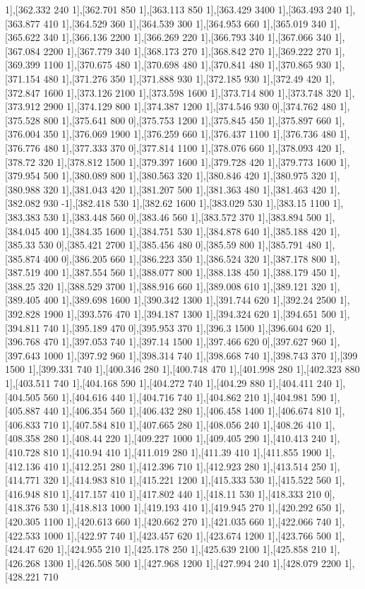 {1],[362.332 240 1],[362.701 850 1],[363.113 850 1],[363.429 3400 1],[363.493 240 1],[363.877 410 1],[364.529 360 1],[364.539 300 1],[364.953 660 1],[365.019 340 1],[365.622 340 1],[366.136 2200 1],[366.269 220 1],[366.793 340 1],[367.066 340 1],[367.084 2200 1],[367.779 340 1],[368.173 270 1],[368.842 270 1],[369.222 270 1],[369.399 1100 1],[370.675 480 1],[370.698 480 1],[370.841 480 1],[370.865 930 1],[371.154 480 1],[371.276 350 1],[371.888 930 1],[372.185 930 1],[372.49 420 1],[372.847 1600 1],[373.126 2100 1],[373.598 1600 1],[373.714 800 1],[373.748 320 1],[373.912 2900 1],[374.129 800 1],[374.387 1200 1],[374.546 930 0],[374.762 480 1],[375.528 800 1],[375.641 800 0],[375.753 1200 1],[375.845 450 1],[375.897 660 1],[376.004 350 1],[376.069 1900 1],[376.259 660 1],[376.437 1100 1],[376.736 480 1],[376.776 480 1],[377.333 370 0],[377.814 1100 1],[378.076 660 1],[378.093 420 1],[378.72 320 1],[378.812 1500 1],[379.397 1600 1],[379.728 420 1],[379.773 1600 1],[379.954 500 1],[380.089 800 1],[380.563 320 1],[380.846 420 1],[380.975 320 1],[380.988 320 1],[381.043 420 1],[381.207 500 1],[381.363 480 1],[381.463 420 1],[382.082 930 -1],[382.418 530 1],[382.62 1600 1],[383.029 530 1],[383.15 1100 1],[383.383 530 1],[383.448 560 0],[383.46 560 1],[383.572 370 1],[383.894 500 1],[384.045 400 1],[384.35 1600 1],[384.751 530 1],[384.878 640 1],[385.188 420 1],[385.33 530 0],[385.421 2700 1],[385.456 480 0],[385.59 800 1],[385.791 480 1],[385.874 400 0],[386.205 660 1],[386.223 350 1],[386.524 320 1],[387.178 800 1],[387.519 400 1],[387.554 560 1],[388.077 800 1],[388.138 450 1],[388.179 450 1],[388.25 320 1],[388.529 3700 1],[388.916 660 1],[389.008 610 1],[389.121 320 1],[389.405 400 1],[389.698 1600 1],[390.342 1300 1],[391.744 620 1],[392.24 2500 1],[392.828 1900 1],[393.576 470 1],[394.187 1300 1],[394.324 620 1],[394.651 500 1],[394.811 740 1],[395.189 470 0],[395.953 370 1],[396.3 1500 1],[396.604 620 1],[396.768 470 1],[397.053 740 1],[397.14 1500 1],[397.466 620 0],[397.627 960 1],[397.643 1000 1],[397.92 960 1],[398.314 740 1],[398.668 740 1],[398.743 370 1],[399 1500 1],[399.331 740 1],[400.346 280 1],[400.748 470 1],[401.998 280 1],[402.323 880 1],[403.511 740 1],[404.168 590 1],[404.272 740 1],[404.29 880 1],[404.411 240 1],[404.505 560 1],[404.616 440 1],[404.716 740 1],[404.862 210 1],[404.981 590 1],[405.887 440 1],[406.354 560 1],[406.432 280 1],[406.458 1400 1],[406.674 810 1],[406.833 710 1],[407.584 810 1],[407.665 280 1],[408.056 240 1],[408.26 410 1],[408.358 280 1],[408.44 220 1],[409.227 1000 1],[409.405 290 1],[410.413 240 1],[410.728 810 1],[410.94 410 1],[411.019 280 1],[411.39 410 1],[411.855 1900 1],[412.136 410 1],[412.251 280 1],[412.396 710 1],[412.923 280 1],[413.514 250 1],[414.771 320 1],[414.983 810 1],[415.221 1200 1],[415.333 530 1],[415.522 560 1],[416.948 810 1],[417.157 410 1],[417.802 440 1],[418.11 530 1],[418.333 210 0],[418.376 530 1],[418.813 1000 1],[419.193 410 1],[419.945 270 1],[420.292 650 1],[420.305 1100 1],[420.613 660 1],[420.662 270 1],[421.035 660 1],[422.066 740 1],[422.533 1000 1],[422.97 740 1],[423.457 620 1],[423.674 1200 1],[423.766 500 1],[424.47 620 1],[424.955 210 1],[425.178 250 1],[425.639 2100 1],[425.858 210 1],[426.268 1300 1],[426.508 500 1],[427.968 1200 1],[427.994 240 1],[428.079 2200 1],[428.221 710 }
